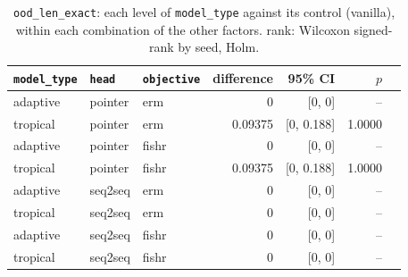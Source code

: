 \documentclass[10pt]{article}
\begin{document}
{\small
\begin{longtable}{lllrrrl}
\caption{\texttt{ood\_len\_exact}: each level of \texttt{model\_type} against its control (vanilla), within each combination of the other factors. rank: Wilcoxon signed-rank by seed, Holm.}\label{tab:control-ood_len_exact}\\
\toprule
\texttt{model\_type} & \texttt{head} & \texttt{objective} & difference & 95\% CI & $p$ & \\
\midrule
\endhead
adaptive & pointer & erm & 0 & [0, 0] & -- & \\
tropical & pointer & erm & 0.09375 & [0, 0.188] & 1.0000 & \\
adaptive & pointer & fishr & 0 & [0, 0] & -- & \\
tropical & pointer & fishr & 0.09375 & [0, 0.188] & 1.0000 & \\
adaptive & seq2seq & erm & 0 & [0, 0] & -- & \\
tropical & seq2seq & erm & 0 & [0, 0] & -- & \\
adaptive & seq2seq & fishr & 0 & [0, 0] & -- & \\
tropical & seq2seq & fishr & 0 & [0, 0] & -- & \\
\bottomrule
\end{longtable}
}
\end{document}
